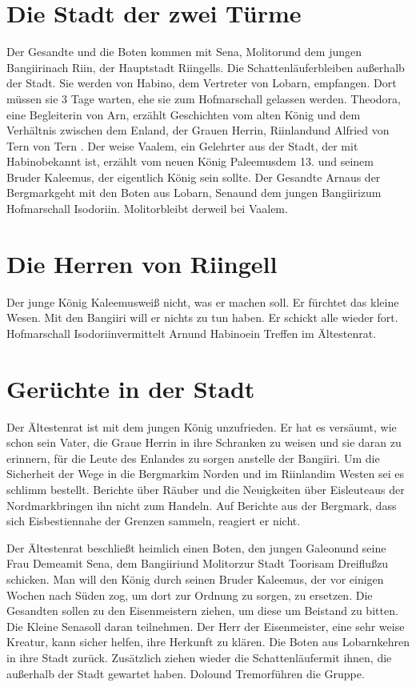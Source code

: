 \documentclass[12pt,a4paper,onecolumn,twoside,ngerman]{book}
\newcommand{\Tern}{Tern }
\newcommand{\Molitor}{Molitor}
\newcommand{\Sena}{Sena}
\newcommand{\Bangiri}{Bangiiri}
\newcommand{\Arwed}{Alfried von \Tern}
\newcommand{\Enland}{Enland}
\newcommand{\Schattenlaufer}{Schattenläufer}
\newcommand{\Dolo}{Dolo}
\newcommand{\Tremor}{Tremor}
\newcommand{\Lobarn}{Lobarn}
\newcommand{\Nordmark}{Nordmark}
\newcommand{\Bergmark}{Bergmark}
\newcommand{\Arn}{Arn}
\newcommand{\Eisleute}{Eisleute}
\newcommand{\Eisbestien}{Eisbestien}
\newcommand{\Theodora}{Theodora}
\newcommand{\Rhinland}{Riinland}
\newcommand{\Rhingell}{Riingell}
\newcommand{\Rhin}{Riin}
\newcommand{\Habino}{Habino}
\newcommand{\Valem}{Vaalem}
\newcommand{\Palemus}{Paleemus}
\newcommand{\Kalemus}{Kaleemus}
\newcommand{\Isodoriin}{Isodoriin}
\newcommand{\Galeon}{Galeon}
\newcommand{\Demea}{Demea}
\newcommand{\Dreifluss}{Dreifluß}
\newcommand{\Toris}{Tooris}
\newcommand{\Eisenmeister}{Eisenmeister}
\begin{document}
\section{Die Stadt der zwei Türme}
Der Gesandte und die Boten kommen mit \Sena , \Molitor  und  dem jungen \Bangiri  nach \Rhin , der Hauptstadt \Rhingell{s}. Die \Schattenlaufer  bleiben außerhalb der Stadt. Sie werden von \Habino , dem Vertreter von \Lobarn , empfangen. Dort müssen sie 3 Tage warten, ehe sie zum Hofmarschall gelassen werden. \Theodora , eine Begleiterin von \Arn , erzählt Geschichten vom alten König und dem Verhältnis zwischen dem \Enland , der Grauen Herrin, \Rhinland und \Arwed von \Tern. 
Der weise \Valem , ein Gelehrter aus der Stadt, der mit \Habino  bekannt ist, erzählt vom neuen König \Palemus dem 13. und seinem Bruder \Kalemus , der eigentlich König sein sollte. Der Gesandte \Arn  aus der \Bergmark  geht mit den Boten aus \Lobarn , \Sena  und dem jungen \Bangiri  zum Hofmarschall \Isodoriin.  \Molitor  bleibt derweil bei \Valem .

\section{Die Herren von \Rhingell}
Der junge König \Kalemus  weiß nicht, was er machen soll. Er fürchtet das kleine Wesen. Mit den \Bangiri  
  will er nichts zu tun haben. Er schickt alle wieder fort. Hofmarschall \Isodoriin vermittelt \Arn und \Habino ein Treffen im Ältestenrat. 

\section{Gerüchte in der Stadt}
Der Ältestenrat ist mit dem jungen König unzufrieden. Er hat es versäumt, wie schon sein Vater, die Graue Herrin in ihre Schranken zu weisen und sie daran zu erinnern, für die Leute des \Enland{es} zu sorgen anstelle der \Bangiri . Um die Sicherheit der Wege in die \Bergmark  im Norden und im \Rhinland  im Westen sei es schlimm bestellt. Berichte über Räuber und die Neuigkeiten über \Eisleute  aus der \Nordmark bringen ihn nicht zum Handeln. Auf Berichte aus der \Bergmark , dass sich \Eisbestien   nahe der Grenzen sammeln, reagiert er nicht.

Der Ältestenrat beschließt heimlich einen Boten, den jungen \Galeon  und seine Frau \Demea mit \Sena , dem \Bangiri  und \Molitor  zur Stadt \Toris  am \Dreifluss  zu schicken. Man will den König durch seinen Bruder \Kalemus , der vor einigen Wochen nach Süden zog, um dort zur Ordnung zu sorgen, zu ersetzen. Die Gesandten sollen zu den \Eisenmeister{n} ziehen, um diese um Beistand zu bitten. Die Kleine \Sena  soll daran teilnehmen. Der Herr der \Eisenmeister, eine sehr weise Kreatur, kann sicher helfen, ihre Herkunft zu klären. Die Boten aus \Lobarn  kehren in ihre Stadt zurück. Zusätzlich ziehen wieder die \Schattenlaufer mit ihnen, die außerhalb der Stadt gewartet haben. \Dolo  und \Tremor  führen die Gruppe.
\end{document}
